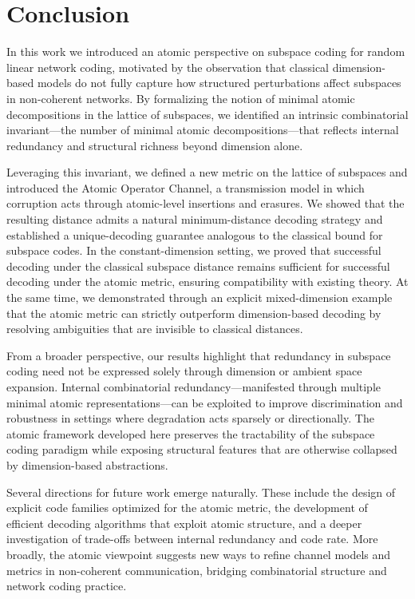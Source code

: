 \documentclass{svproc}
\begin{document}
\section{Conclusion}\label{sec:conclusion}

In this work we introduced an atomic perspective on subspace coding for random
linear network coding, motivated by the observation that classical
dimension-based models do not fully capture how structured perturbations affect
subspaces in non-coherent networks. By formalizing the notion of minimal atomic
decompositions in the lattice of subspaces, we identified an intrinsic
combinatorial invariant—the number of minimal atomic decompositions—that reflects
internal redundancy and structural richness beyond dimension alone.

Leveraging this invariant, we defined a new metric on the lattice of subspaces
and introduced the Atomic Operator Channel, a transmission model in which
corruption acts through atomic-level insertions and erasures. We showed that the
resulting distance admits a natural minimum-distance decoding strategy and
established a unique-decoding guarantee analogous to the classical bound for
subspace codes. In the constant-dimension setting, we proved that successful
decoding under the classical subspace distance remains sufficient for successful
decoding under the atomic metric, ensuring compatibility with existing theory.
At the same time, we demonstrated through an explicit mixed-dimension example
that the atomic metric can strictly outperform dimension-based decoding by
resolving ambiguities that are invisible to classical distances.

From a broader perspective, our results highlight that redundancy in subspace
coding need not be expressed solely through dimension or ambient space expansion.
Internal combinatorial redundancy—manifested through multiple minimal atomic
representations—can be exploited to improve discrimination and robustness in
settings where degradation acts sparsely or directionally. The atomic framework
developed here preserves the tractability of the subspace coding paradigm while
exposing structural features that are otherwise collapsed by dimension-based
abstractions.

Several directions for future work emerge naturally. These include the design of
explicit code families optimized for the atomic metric, the development of
efficient decoding algorithms that exploit atomic structure, and a deeper
investigation of trade-offs between internal redundancy and code rate. More
broadly, the atomic viewpoint suggests new ways to refine channel models and
metrics in non-coherent communication, bridging combinatorial structure and
network coding practice.
\end{document}
